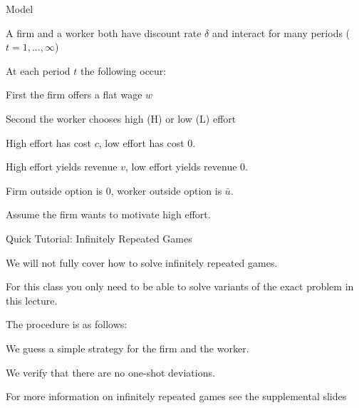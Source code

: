 \documentclass[aspectratio=169,usenames,dvipsnames]{beamer}
\newenvironment{wideitemize}{\itemize\addtolength{\itemsep}{10pt}}{\enditemize}
\begin{document}
\begin{frame}{Model}
\begin{wideitemize}
    \item A firm and a worker both have discount rate $\delta$ and interact for many periods ($t=1,...,\infty$)
    \item At each period $t$ the following occur:
    \begin{wideitemize}
        \item First the firm offers a flat wage $w$
        \item Second the worker chooses high (H) or low (L) effort
    \end{wideitemize}
    \item High effort has cost $c$, low effort has cost 0.
    \item High effort yields revenue $v$, low effort yields revenue 0.
    \item Firm outside option is 0, worker outside option is $\bar u$.
    \item Assume the firm wants to motivate high effort.
\end{wideitemize}
    
\end{frame}

\begin{frame}{Quick Tutorial: Infinitely Repeated Games}
\begin{wideitemize}
    \item We will not fully cover how to solve infinitely repeated games.
    \item For this class you only need to be able to solve variants of the exact problem in this lecture.
    \item The procedure is as follows:
    \begin{wideitemize}
        \item We guess a simple strategy for the firm and the worker.
        \item We verify that there are no one-shot deviations.
    \end{wideitemize}
    \item For more information on infinitely repeated games see the supplemental slides 
\end{wideitemize}
    
\end{frame}
\end{document}
